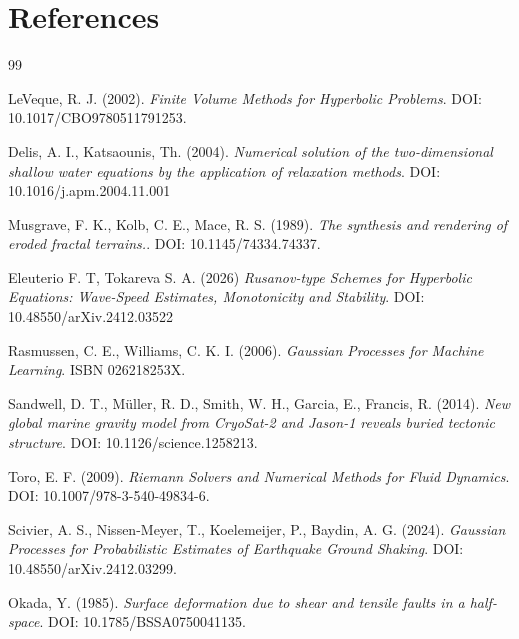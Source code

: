 \clearpage
\section*{References}

\begin{thebibliography}{99}

LeVeque, R. J. (2002).
\textit{Finite Volume Methods for Hyperbolic Problems}.
DOI: 10.1017/CBO9780511791253.

Delis, A. I., Katsaounis, Th. (2004).
\textit{Numerical solution of the two-dimensional shallow water equations by the application of relaxation methods}.
DOI: 10.1016/j.apm.2004.11.001

Musgrave, F. K., Kolb, C. E., Mace, R. S. (1989).
\textit{The synthesis and rendering of eroded fractal terrains.}.
DOI: 10.1145/74334.74337.

Eleuterio F. T, Tokareva S. A. (2026)
\textit{Rusanov-type Schemes for Hyperbolic Equations: Wave-Speed Estimates, Monotonicity and Stability}.
DOI: 10.48550/arXiv.2412.03522

Rasmussen, C. E., Williams, C. K. I. (2006).
\textit{Gaussian Processes for Machine Learning}.
ISBN 026218253X.

Sandwell, D. T., Müller, R. D., Smith, W. H., Garcia, E., Francis, R. (2014).
\textit{New global marine gravity model from CryoSat-2 and Jason-1 reveals buried tectonic structure}.
DOI: 10.1126/science.1258213.

Toro, E. F. (2009).
\textit{Riemann Solvers and Numerical Methods for Fluid Dynamics}.
DOI: 10.1007/978-3-540-49834-6.

Scivier, A. S., Nissen-Meyer, T., Koelemeijer, P., Baydin, A. G. (2024).
\textit{Gaussian Processes for Probabilistic Estimates of Earthquake Ground Shaking}.
DOI: 10.48550/arXiv.2412.03299.

Okada, Y. (1985).
\textit{Surface deformation due to shear and tensile faults in a half-space}.
DOI: 10.1785/BSSA0750041135.

\end{thebibliography}